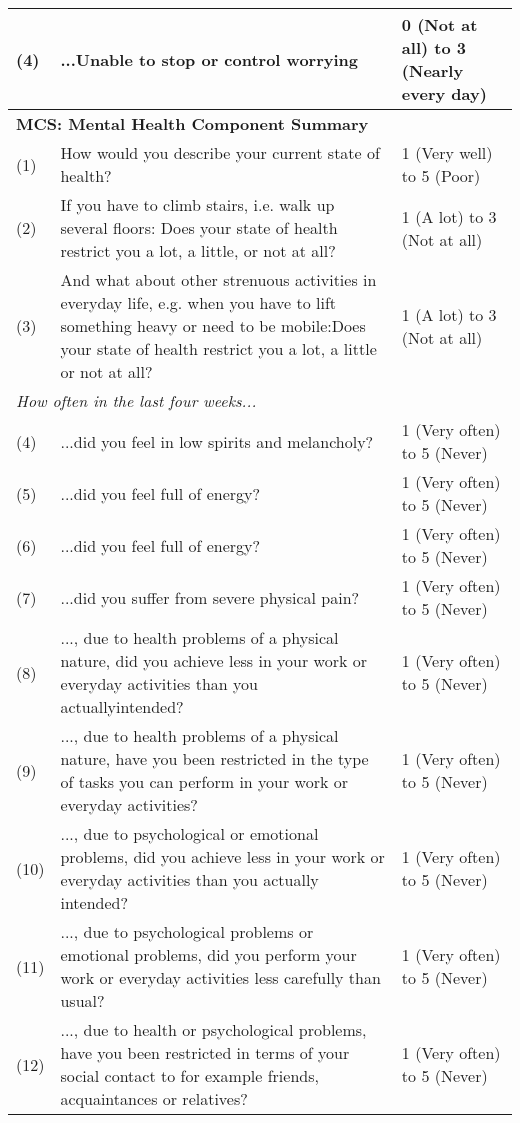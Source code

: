 \begin{table}[H]
\begin{tabular}{p{0.5cm}p{8cm}p{4cm}}
 (4) & ...Unable to stop or control worrying & 0 (Not at all) to 3 (Nearly every day)\\ \midrule
\multicolumn{3}{l}{\textbf{MCS: Mental Health Component Summary}} \vspace{0.2cm} \\
 (1) & How would you describe your current state of health? & 1 (Very well) to 5 (Poor) \\
 (2) & If you have to climb stairs, i.e. walk up several floors: Does your state of health restrict you a lot, a little, or not at all? & 1 (A lot) to 3 (Not at all) \\\vspace{0.2cm}
 (3) & And what about other strenuous activities in everyday life, e.g. when you have to lift something heavy or need to be mobile:Does your state of health restrict you a lot, a little or not at all? & 1 (A lot) to 3 (Not at all) \\
 \multicolumn{3}{l}{\textit{How often in the last four weeks...}} \\
 (4) & ...did you feel in low spirits and melancholy? & 1 (Very often) to 5 (Never) \\
 (5) & ...did you feel full of energy? & 1 (Very often) to 5 (Never) \\
 (6) & ...did you feel full of energy? & 1 (Very often) to 5 (Never) \\
 (7) & ...did you suffer from severe physical pain? & 1 (Very often) to 5 (Never) \\
 (8) & ..., due to health problems of a physical nature, did you achieve less in your work or everyday activities than you actuallyintended? & 1 (Very often) to 5 (Never) \\
 (9) & ..., due to health problems of a physical nature, have you been restricted in the type of tasks you can perform in your work or everyday activities? & 1 (Very often) to 5 (Never) \\
 (10) & ..., due to psychological or emotional problems, did you achieve less in your work or everyday activities than you actually intended? & 1 (Very often) to 5 (Never) \\
 (11) & ..., due to psychological problems or emotional problems, did you perform your work or everyday activities less carefully than usual? & 1 (Very often) to 5 (Never) \\
 (12) & ..., due to health or psychological problems, have you been restricted in terms of your social contact to for example friends, acquaintances or relatives? & 1 (Very often) to 5 (Never) \\
 \bottomrule
\end{tabular}
\end{table}
